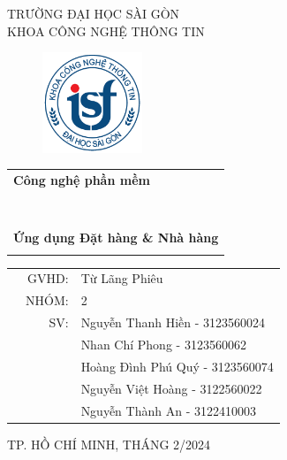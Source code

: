 \documentclass[a4paper]{article}
\begin{document}
\begin{titlepage}
\begin{center}
TRƯỜNG ĐẠI HỌC SÀI GÒN \\
KHOA CÔNG NGHỆ THÔNG TIN
\end{center}
\vspace{1cm}

\begin{figure}[h!]
\begin{center}
\includegraphics[width=3cm]{logoITSGU.png}
\end{center}
\end{figure}

\vspace{1cm}


\begin{center}
\begin{tabular}{c}
	\multicolumn{1}{l}{\textbf{{\Large Công nghệ phần mềm}}}\\
	~~\\
	\hline
	\\
	\multicolumn{1}{l}{\textbf{{\Large  }}}\\
	\\
	
	\textbf{{\Huge Ứng dụng Đặt hàng \& Nhà hàng}}\\
	\\
	\hline
\end{tabular}
\end{center}

\vspace{3cm}

\begin{table}[h]
\begin{tabular}{rrl}
\hspace{5 cm} & GVHD: &Từ Lãng Phiêu\\
\hspace{5 cm} & NHÓM: &2\\
& SV: & Nguyễn Thanh Hiền - 3123560024 \\
& & Nhan Chí Phong - 3123560062 \\
& & Hoàng Đình Phú Quý - 3123560074 \\
& & Nguyễn Việt Hoàng - 3122560022 \\
& & Nguyễn Thành An - 3122410003 \\

\end{tabular}
\vspace{1.5 cm}
\end{table}

\begin{center}

{\footnotesize TP. HỒ CHÍ MINH, THÁNG 2/2024}
\end{center}
\end{titlepage}
\end{document}
